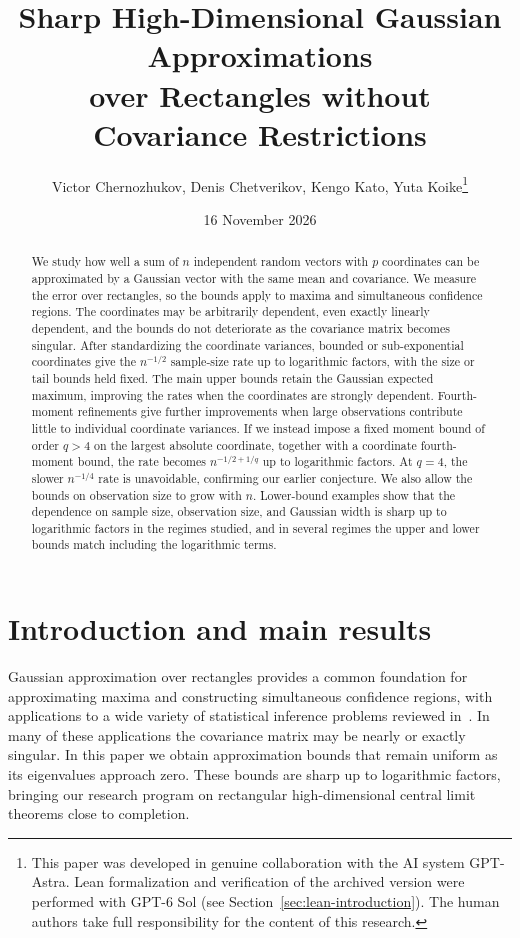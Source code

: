 \documentclass[11pt,letterpaper,twoside,leqno]{article}
\title{\Large Sharp High-Dimensional Gaussian Approximations\\[0.15em]
over Rectangles without Covariance Restrictions}
\author{\normalsize Victor Chernozhukov, Denis Chetverikov, Kengo Kato, Yuta
Koike\thanks{This paper
was developed in genuine collaboration with the AI system GPT-Astra.
Lean formalization and verification of the archived version were performed
with GPT-6 Sol
(see Section~\ref{sec:lean-introduction}). The human authors take full
responsibility for the content of this research.}}
\date{\normalsize 16 November 2026}
\theoremstyle{bookplain}
\theoremstyle{bookremark}
\begin{document}
\maketitle

\begin{abstract}

We study how well a sum of \(n\) independent random vectors with \(p\)
coordinates can be approximated by a Gaussian vector with the same
mean and covariance. We measure the error over rectangles, so the bounds apply
to maxima and simultaneous confidence regions. The coordinates may
be arbitrarily dependent, even exactly linearly dependent, and the
bounds do not deteriorate as the covariance matrix becomes singular.
After standardizing the coordinate variances, bounded or
sub-exponential coordinates give the \(n^{-1/2}\) sample-size
rate up to logarithmic factors, with the size or tail bounds held
fixed. {The main upper bounds retain the Gaussian expected maximum,
improving the rates when the coordinates are strongly dependent.
Fourth-moment refinements give further improvements when large
observations contribute little to individual coordinate variances.} If we instead impose a fixed moment bound of order
\(q>4\) on the largest absolute coordinate, together with a coordinate
fourth-moment bound, the rate becomes \(n^{-1/2+1/q}\) up to
logarithmic factors. At \(q=4\), the slower \(n^{-1/4}\) rate is
unavoidable, confirming our earlier conjecture. We also allow the
bounds on observation size to grow with \(n\). Lower-bound examples
show that the dependence on {sample size, observation size, and
Gaussian width} is sharp
up to logarithmic factors in the regimes studied, and in several
regimes the upper and lower bounds match including the logarithmic
terms.
\end{abstract}

\begingroup
\setcounter{tocdepth}{1}
\small
\makeatletter
\patchcmd{\l@section}{1.0em \@plus\p@}{0.5em \@plus\p@}{}{}
\makeatother
\tableofcontents
\endgroup
\clearpage

\section{\texorpdfstring{Introduction and main results}{Introduction and main results}}\label{sec:results}
Gaussian approximation over rectangles provides a common foundation for
approximating maxima and constructing simultaneous confidence regions, with
applications to a wide variety of statistical inference problems reviewed in~\cite{CCKK2023}.
In many of these applications the {covariance} matrix may be nearly or
exactly singular. {In this paper we obtain} approximation bounds that remain uniform
as its eigenvalues approach zero. {These bounds are sharp up to
logarithmic factors, bringing our research program on rectangular
high-dimensional central limit theorems close to completion.}
\end{document}
